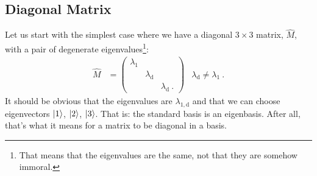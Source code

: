 \documentclass[12pt, oneside]{report}    %
\begin{document}
\subsection*{Diagonal Matrix}

Let us start with the simplest case where we have a diagonal $3\times 3$ matrix, $\hat M$, with a pair of degenerate eigenvalues\footnote{That means that the eigenvalues are the same, not that they are somehow immoral.}:
\begin{align} 
    \hat M &= 
    \begin{pmatrix}
        \lambda_1 & & \\
        & \lambda_\text{d} & \\
        & & \lambda_\text{d} \ .
    \end{pmatrix}
    &
    \lambda_\text{d}  \neq \lambda_1\ .
    \label{eq:degenerate:eigenvalue:diagonal}
\end{align}
It should be obvious that the eigenvalues are $\lambda_{1,\text{d}}$ and that we can choose eigenvectors $\left|1\right\rangle$, $\left|2\right\rangle$, $\left|3\right\rangle$. That is: the standard basis is an eigenbasis. After all, that's what it means for a matrix to be diagonal in a basis. 
\end{document}
